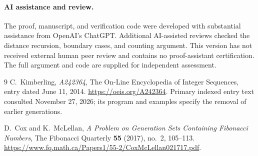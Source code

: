 \documentclass[11pt]{article}
\theoremstyle{remark}
\begin{document}
\paragraph{AI assistance and review.}
The proof, manuscript, and verification code were developed with
substantial assistance from OpenAI's ChatGPT. Additional AI-assisted
reviews checked the distance recursion, boundary cases, and counting
argument. This version has not received external human peer review and
contains no proof-assistant certification. The full argument and code
are supplied for independent assessment.

\begin{thebibliography}{9}
C.~Kimberling, \emph{A242364}, The On-Line Encyclopedia of Integer
Sequences, entry dated June 11, 2014.
\url{https://oeis.org/A242364}.
Primary indexed entry text consulted November 27, 2026; its program
and examples specify the removal of earlier generations.

D.~Cox and K.~McLellan, \emph{A Problem on Generation Sets Containing
Fibonacci Numbers}, The Fibonacci Quarterly \textbf{55} (2017), no.~2,
105--113.
\url{https://www.fq.math.ca/Papers1/55-2/CoxMcLellan021717.pdf}.
\end{thebibliography}
\end{document}
